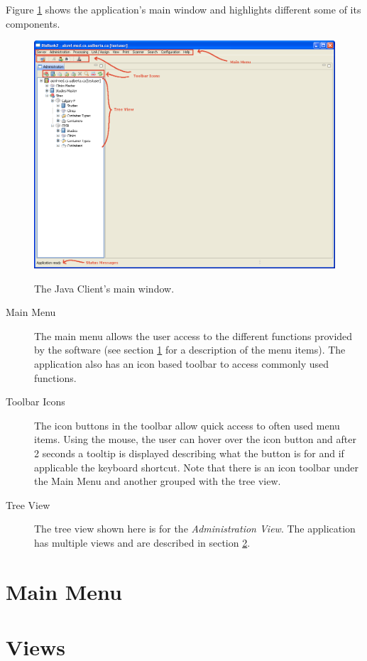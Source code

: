 Figure \ref{fig:main_window} shows the application's main window and highlights
different some of its components.
    \begin{figure}[H]
      \centering
      \scalebox{0.4}
      { \includegraphics*{screenshots/overview/main_window} }
      \caption{The Java Client's main window.}
      \label{fig:main_window}
    \end{figure}
\begin{description}
  \item[Main Menu] The main menu allows the user access to the different
    functions provided by the software (see section \ref{sec:main_menu} for a
    description of the menu items). The application also has an icon based
    toolbar to access commonly used functions.
  \item[Toolbar Icons] The icon buttons in the toolbar allow quick access to
    often used menu items. Using the mouse, the user can hover over the icon
    button and after 2 seconds a tooltip is displayed describing what the
    button is for and if applicable the keyboard shortcut. Note that there is
    an icon toolbar under the Main Menu and another grouped with the tree view.
  \item[Tree View] The tree view shown here is for the \emph{Administration
    View}. The application has multiple views and are described in section
    \ref{sec:application_views}.
\end{description}

\section{Main Menu}
\label{sec:main_menu}

\section{Views}
\label{sec:application_views}
